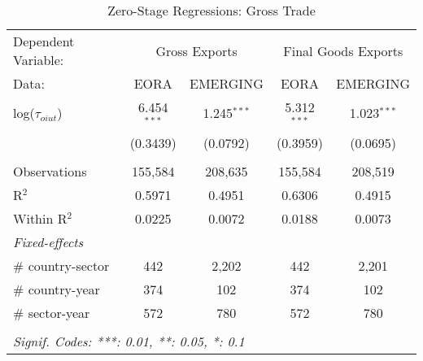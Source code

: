 \documentclass[a4paper]{article}
\begin{document}
\begin{table}[htbp]
   \caption{\label{tab:ZS_GT_FULL} Zero-Stage Regressions: Gross Trade}
   \centering
   \begin{tabular}{lcccc}
      \tabularnewline \toprule
      Dependent Variable: & \multicolumn{2}{c}{Gross Exports} & \multicolumn{2}{c}{Final Goods Exports} \\ \cmidrule(lr){2-5}
      Data:                               & EORA           & EMERGING        & EORA           & EMERGING \\   
      \midrule
      log($\tau_{oiut}$)      & 6.454$^{***}$ & 1.245$^{***}$ & 5.312$^{***}$ & 1.023$^{***}$\\  
                                   & (0.3439)      & (0.0792)    & (0.3959)      & (0.0695)\\ \\   
      Observations                 & 155,584       & 208,635       & 155,584       & 208,519\\  
      R$^2$                        & 0.5971        & 0.4951        & 0.6306        & 0.4915\\  
      Within R$^2$                 & 0.0225        & 0.0072        & 0.0188        & 0.0073\\     
      \midrule
      \emph{Fixed-effects}  \\
     \# country-sector            & 442           & 2,202         & 442           & 2,201\\  
      \# country-year              & 374           & 102           & 374           & 102\\  
      \# sector-year               & 572           & 780           & 572           & 780\\  
      \bottomrule \\ [-0.9em]
      \multicolumn{5}{l}{\emph{Signif. Codes: ***: 0.01, **: 0.05, *: 0.1}}\\
   \end{tabular}
\end{table}
\FloatBarrier
\end{document}
